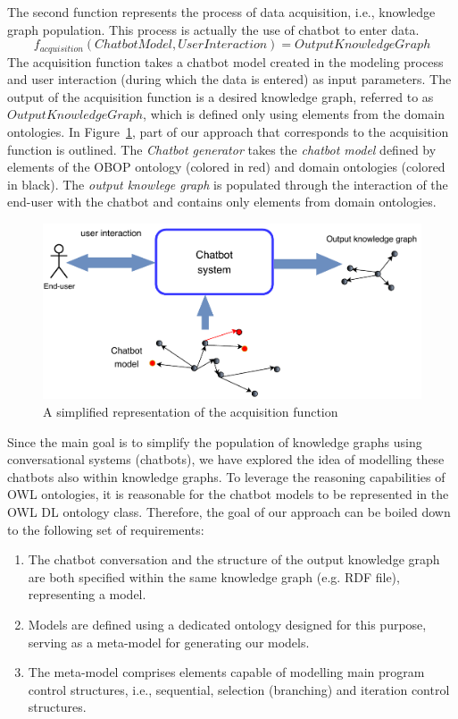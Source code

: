 \documentclass[runningheads]{llncs}
\begin{document}
The second function represents the process of data acquisition, i.e., knowledge graph population. This process is actually the use of chatbot to enter data.
$$f_{acquisition}(ChatbotModel, UserInteraction) = OutputKnowledgeGraph$$
The acquisition function takes a chatbot model created in the modeling process and user interaction (during which the data is entered) as input parameters. The output of the acquisition function is a desired knowledge graph, referred to as $OutputKnowledgeGraph$, which is defined only using elements from the domain ontologies. In Figure~\ref{fig:chatbotsystem}, part of our approach that corresponds to the acquisition function is outlined. The \textit{Chatbot generator} takes the \textit{chatbot model} defined by elements of the OBOP ontology (colored in red) and domain ontologies (colored in black). The \textit{output knowlege graph} is populated through the interaction of the end-user with the chatbot and contains only elements from domain ontologies.
\begin{figure}[H]
  \centering
  \includegraphics[width=0.9\linewidth]{img/chatbot-system}
  \caption{A simplified representation of the acquisition function}
  \label{fig:chatbotsystem}
\end{figure}
Since the main goal is to simplify the population of knowledge graphs using conversational systems (chatbots), we have explored the idea of modelling these chatbots also within knowledge graphs. To leverage the reasoning capabilities of OWL ontologies, it is reasonable for the chatbot models to be represented in the OWL DL ontology class. Therefore, the goal of our approach can be boiled down to the following set of requirements:
\begin{enumerate}
\item
  The chatbot conversation and the structure of the output knowledge graph are both specified within the same knowledge graph (e.g. RDF file), representing a model.
\item
  Models are defined using a dedicated ontology designed for this purpose, serving as a meta-model for generating our models.
\item
The meta-model comprises elements capable of modelling main program control structures, i.e., sequential, selection (branching) and iteration control structures. 
\end{enumerate}
\end{document}
